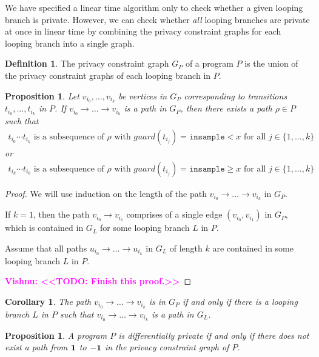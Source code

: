 \documentclass[12pt]{article}
\newcommand{\gguard}[1][x]{\texttt{insample}\geq#1}
\newcommand{\lguard}[1][x]{\texttt{insample} < #1}
\newcommand{\todo}[2]{\textcolor{#1}{\textbf{#2}}}
\newcommand{\vishnu}[1]{\todo{magenta}{Vishnu: <<#1>>}}
\newtheorem{prop}[thm]{Proposition}
\newtheorem{cor}[thm]{Corollary}
\theoremstyle{definition}
\newtheorem{defn}[thm]{Definition}
\begin{document}
We have specified a linear time algorithm only to check whether a given looping branch is private. However, we can check whether \textit{all} looping branches are private at once in linear time by combining the privacy constraint graphs for each looping branch into a single graph.

\begin{defn}
    The privacy constraint graph $G_P$ of a program $P$ is the union of the privacy constraint graphs of each looping branch in $P$.
\end{defn}

\begin{prop}
    \label{prop:paths_in_privacy_graph}
    Let $v_{i_0}, \dots, v_{i_k}$ be vertices in $G_P$ corresponding to transitions $t_{i_0}, \dots, t_{i_k}$ in $P$. If $v_{i_0} \to \dots \to v_{i_k}$ is a path in $G_P$, then there exists a path $\rho \in P$ such that 
    \begin{align*}
        t_{i_0} \cdots t_{i_k} \text{ is a subsequence of } \rho \text{ with } guard(t_{i_j}) = \lguard \text { for all } j \in \{1, \dots, k\}
    \end{align*}
    or
    \begin{align*}
        t_{i_k} \cdots t_{i_0} \text{ is a subsequence of } \rho \text{ with } guard(t_{i_j}) = \gguard \text { for all } j \in \{1, \dots, k\}
    \end{align*}
\end{prop}


\begin{proof}
    We will use induction on the length of the path $v_{i_0} \to \dots \to v_{i_k}$ in $G_P$. 
    
    If $k = 1$, then the path $v_{i_0} \to v_{i_1}$ comprises of a single edge $(v_{i_0}, v_{i_1})$ in $G_P$, which is contained in $G_L$ for some looping branch $L$ in $P$. 

    Assume that all paths $u_{i_0} \to \dots \to u_{i_k}$ in $G_L$ of length $k$ are contained in some looping branch $L$ in $P$.
    
    \vishnu{TODO: Finish this proof.}
\end{proof}


\begin{cor}
    The path $v_{i_0} \to \dots \to v_{i_k}$ is in $G_P$ if and only if there is a looping branch $L$ in $P$ such that $v_{i_0} \to \dots \to v_{i_k}$ is a path in $G_L$.
\end{cor}

\begin{prop}
    A program $P$ is differentially private if and only if there does not exist a path from $\bf 1$ to $\bf -1$ in the privacy constraint graph of $P$.
\end{prop}
\end{document}
